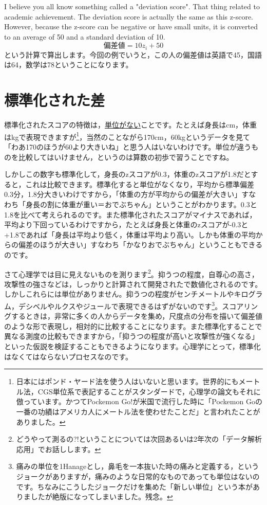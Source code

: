 \documentclass{ltjbook}
\begin{document}
I believe you all know something called a "deviation score". That thing related to academic achievement. The deviation score is actually the same as this z-score. However, because the z-score can be negative or have small units, it is converted to an average of 50 and a standard deviation of 10.
\[ \text{偏差値}= 10z_i + 50 \]
という計算で算出します。今回の例でいうと，この人の偏差値は英語で45，国語は64，数学は78ということになります。

\section{標準化された差}
\label{std_effectsize}
標準化されたスコアの特徴は，\underline{単位がない}ことです。たとえば身長はcm，体重はkgで表現できますが\footnote{日本にはポンド・ヤード法を使う人はいないと思います。世界的にもメートル法，CGS単位系で表記することがスタンダードで，心理学の論文もそれに倣っています。かつてPockemon Go!が米国で流行した時に「Pockemon Goの一番の功績はアメリカ人にメートル法を使わせたことだ」と言われたことがありました。}，当然のことながら170cm，60kgというデータを見て「わあ170のほうが60より大きいね」と思う人はいないわけです。単位が違うものを比較してはいけません，というのは算数の初歩で習うことですね。

しかしこの数字も標準化して，身長のzスコアが0.3，体重のzスコアが1.8だとすると，これは比較できます。標準化すると単位がなくなり，平均から標準偏差0.3分，1.8分大きいわけですから，「体重の方が平均からの偏差が大きい」すなわち「身長の割に体重が重い＝おでぶちゃん」ということがわかります。0.3と1.8を比べて考えられるのです。また標準化されたスコアがマイナスであれば，平均より下回っているわけですから，たとえば身長と体重のzスコアが-0.3と+1.8であれば「身長は平均より低く，体重は平均より高い。しかも体重の平均からの偏差のほうが大きい」すなわち「かなりおでぶちゃん」ということもできるのです。

さて心理学では目に見えないものを測ります\footnote{どうやって測るの?!ということについては次回あるいは2年次の「データ解析応用」でお話しします。}。抑うつの程度，自尊心の高さ，攻撃性の強さなどは，しっかりと計算されて開発されたで数値化されるのです。しかしこれらには単位がありません。抑うつの程度がセンチメートルやキログラム，デシベルやルクスやジュールで表現できるはずがないのです\footnote{痛みの単位を1Hanageとし，鼻毛を一本抜いた時の痛みと定義する，というジョークがありますが，痛みのような日常的なものであっても単位はないのです。ちなみにこうしたジョークだけを集めた「新しい単位」\parencite{Hanage2017}という本がありましたが絶版になってしまいました。残念。}。スコアリングするときは，非常に多くの人からデータを集め，尺度点の分布を描いて偏差値のような形で表現し，相対的に比較することになります。また標準化することで異なる測度の比較もできますから，「抑うつの程度が高いと攻撃性が強くなる」といった仮説を検証することもできるようになります。心理学にとって，標準化はなくてはならないプロセスなのです。
\end{document}
